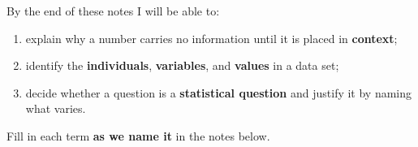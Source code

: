 \documentclass[10pt]{article}
\begin{document}

\vspace{0.12in}

\boxguard[14]
\begin{objectivebox}
\small
By the end of these notes I will be able to:
\begin{enumerate}[leftmargin=1.6em, nosep, after=\vspace{2pt}]
  \item explain why a number carries no information until it is placed in \textbf{context};
  \item identify the \textbf{individuals}, \textbf{variables}, and \textbf{values} in a data set;
  \item decide whether a question is a \textbf{statistical question} and justify it by naming
        what varies.
\end{enumerate}
\end{objectivebox}

\vspace{0.10in}

\boxguard[20]
\begin{vocabbox}
\small
Fill in each term \textbf{as we name it} in the notes below.
\par
{}
\par
{}
\par
{}
\par
{}
\par
{}
\par
\end{vocabbox}

\vspace{0.10in}
\end{document}

